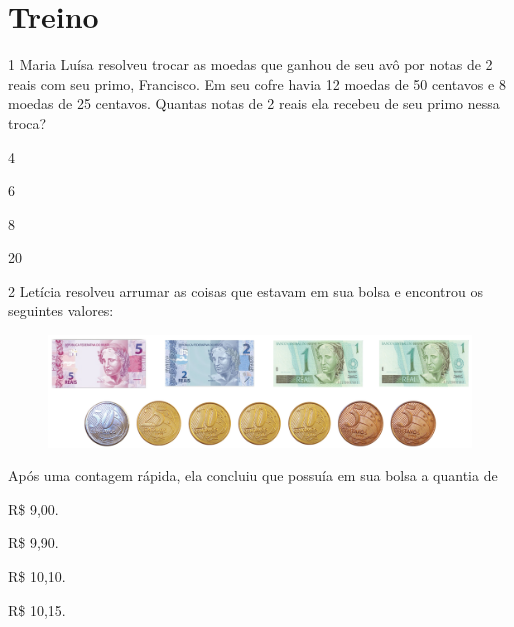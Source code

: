 \section{Treino}

\num{1} Maria Luísa resolveu trocar as moedas que ganhou de seu avô por
notas de 2 reais com seu primo, Francisco. Em seu cofre havia 12 moedas de 50 centavos e 8 moedas de 25 centavos. Quantas notas de 2
reais ela recebeu de seu primo nessa troca?

\begin{minipage}{.5\textwidth}
\begin{escolha}
\item
  4
\item
  6
\item
  8
\item
  20
\end{escolha}
\end{minipage}

\pagebreak

\num{2} Letícia resolveu arrumar as coisas que estavam em sua bolsa e
encontrou os seguintes valores:

\begin{figure}[htpb!]
\includegraphics[width=\textwidth]{../ilustracoes/MAT5/SAEB_5ANO_MAT_figura56.png}
\end{figure}

Após uma contagem rápida, ela concluiu que possuía em sua bolsa a quantia de

\begin{minipage}{.5\textwidth}
\begin{escolha}
\item
  R\$ 9,00.
\item
  R\$ 9,90.
\item
  R\$ 10,10.
\item
  R\$ 10,15.
\end{escolha}
\end{minipage}

